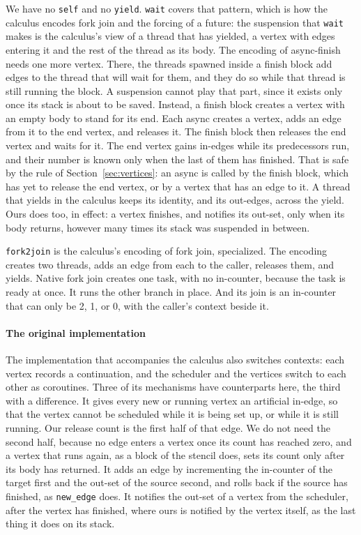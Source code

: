 \documentclass[sigplan,nonacm]{acmart}
\begin{document}
We have no \lstinline|self| and no \lstinline|yield|.
%
\lstinline|wait| covers that pattern, which is how the calculus
encodes fork join and the forcing of a future: the suspension that
\lstinline|wait| makes is the calculus's view of a thread that has
yielded, a vertex with edges entering it and the rest of the thread as
its body.
%
The encoding of async-finish needs one more vertex.
%
There, the threads spawned inside a finish block add edges to the
thread that will wait for them, and they do so while that thread is
still running the block.
%
A suspension cannot play that part, since it exists only once its
stack is about to be saved.
%
Instead, a finish block creates a vertex with an empty body to stand
for its end.
%
Each async creates a vertex, adds an edge from it to the end vertex,
and releases it.
%
The finish block then releases the end vertex and waits for it.
%
The end vertex gains in-edges while its predecessors run, and their
number is known only when the last of them has finished.
%
That is safe by the rule of Section~\ref{sec:vertices}: an async is
called by the finish block, which has yet to release the end vertex, or
by a vertex that has an edge to it.
%
A thread that yields in the calculus keeps its identity, and its
out-edges, across the yield.
%
Ours does too, in effect: a vertex finishes, and notifies its
out-set, only when its body returns, however many times its stack was
suspended in between.

\lstinline|fork2join| is the calculus's encoding of fork join,
specialized.
%
The encoding creates two threads, adds an edge from each to the
caller, releases them, and yields.
%
Native fork join creates one task, with no in-counter, because the
task is ready at once.
%
It runs the other branch in place.
%
And its join is an in-counter that can only be 2, 1, or 0, with the
caller's context beside it.

\paragraph{The original implementation}
%
The implementation that accompanies the calculus also switches
contexts: each vertex records a continuation, and the scheduler and
the vertices switch to each other as coroutines.
%
Three of its mechanisms have counterparts here, the third with a
difference.
%
It gives every new or running vertex an artificial in-edge, so that the
vertex cannot be scheduled while it is being set up, or while it is
still running.
%
Our release count is the first half of that edge.
%
We do not need the second half, because no edge enters a vertex once
its count has reached zero, and a vertex that runs again, as a block
of the stencil does, sets its count only after its body has returned.
%
It adds an edge by incrementing the in-counter of the target first and
the out-set of the source second, and rolls back if the source has
finished, as \lstinline|new_edge| does.
%
It notifies the out-set of a vertex from the scheduler, after the
vertex has finished, where ours is notified by the vertex itself, as
the last thing it does on its stack.
\end{document}
